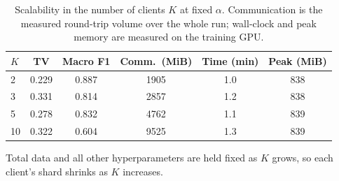 \begin{table}[t]
\caption{Scalability in the number of clients $K$ at fixed $\alpha$. Communication is the measured round-trip volume over the whole run; wall-clock and peak memory are measured on the training GPU.}
\label{tab:client_sweep}
\centering\footnotesize
\setlength\tabcolsep{5pt}
\begin{tabular}{lccccc}
\toprule
\textbf{$K$} & TV & \textbf{Macro F1} & Comm.\ (MiB) & Time (min) & Peak (MiB)\\
\midrule
2 & 0.229 & 0.887 & 1905 & 1.0 & 838 \\
3 & 0.331 & 0.814 & 2857 & 1.2 & 838 \\
5 & 0.278 & 0.832 & 4762 & 1.1 & 839 \\
10 & 0.322 & 0.604 & 9525 & 1.3 & 839 \\
\bottomrule
\end{tabular}
\vspace{1pt}

{\scriptsize Total data and all other hyperparameters are held fixed as $K$ grows, so each client's shard shrinks as $K$ increases.}
\end{table}
